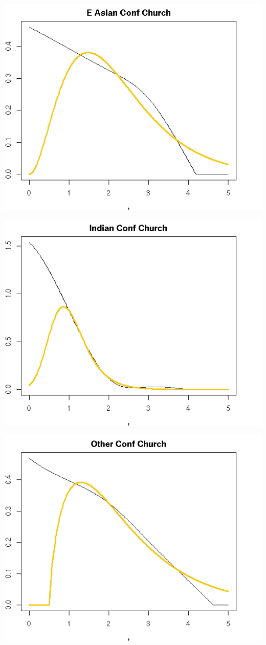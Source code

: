 \documentclass{amsart}
\begin{document}
\includegraphics[scale=0.8]{cfchurch_eastasian.png}

\includegraphics[scale=0.8]{cfchurch_indian.png}

\includegraphics[scale=0.8]{cfchurch_other.png}
\end{document}
